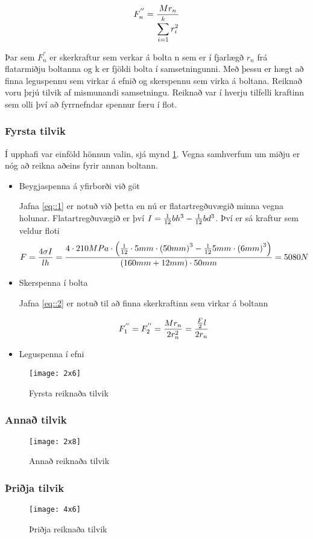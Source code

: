 \begin{equation}
	F_n^{''} = {M r_n \over \displaystyle\sum_{i=1}^{k} r_i^2}
	\label{eq::2}
\end{equation}

Þar sem $F_n^{''}$ er skerkraftur sem verkar á bolta n sem er í fjarlægð $r_n$ frá flatarmiðju boltanna og k er fjöldi bolta í samsetningunni. Með þessu er hægt að finna leguspennu sem virkar á efnið og skerspennu sem virka á boltana. Reiknað voru þrjú tilvik af mismunandi samsetningu. Reiknað var í hverju tilfelli kraftinn sem olli því að fyrrnefndar spennur færu í flot.

\subsubsection{Fyrsta tilvik}

Í upphafi var einföld hönnun valin, sjá mynd \ref{fig::2x6}. Vegna samhverfum um miðju er nóg að reikna aðeins fyrir annan boltann.

\begin{itemize}
	\item Beygjaspenna á yfirborði við göt
	
Jafna \ref{eq::1} er notuð við þetta en nú er flatartregðuvægið minna vegna holunar. Flatartregðuvægið er því $I = {1 \over 12}bh^3 - {1 \over 12}bd^3$. Því er sá kraftur sem veldur floti
\[
F = \frac{4 \sigma I}{l h} = {4 \cdot 210 MPa \cdot  \left({1 \over 12} \cdot 5 mm \cdot \left(50mm\right)^3 - {1 \over 12} 5 mm \cdot \left(6mm\right)^3\right) \over (160 mm + 12 mm) \cdot 50 mm} = 5080N
\] 

	\item Skerspenna í bolta

Jafna \ref{eq::2} er notuð til að finna skerkraftinn sem virkar á boltann

\[
F_1^{''} = F_2^{''} = {Mr_n \over 2r_n^2} = {{F \over 2}l \over 2 r_n} 
\]



	\item Leguspenna í efni
\end{itemize}


\begin{figure}
	\centering
	\texttt{[image: 2x6]}
	\caption{Fyrsta reiknaða tilvik}
	\label{fig::2x6}
\end{figure}

\subsubsection{Annað tilvik}
\begin{figure}
	\centering
	\texttt{[image: 2x8]}
	\caption{Annað reiknaða tilvik}
	\label{fig::2x8}
\end{figure}

\subsubsection{Þriðja tilvik}
\begin{figure}
	\centering
	\texttt{[image: 4x6]}
	\caption{Þriðja reiknaða tilvik}
	\label{fig::4x6}
\end{figure}